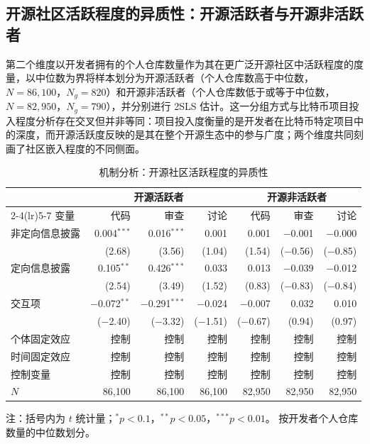 \documentclass[
    type = master, %
    degree = professional,        %
    decl-page,  %
    twoside,                %
    fontset = fandol %
  ]{njuthesis}
\renewcommand{\footnotesize}{\zihao{-5}}
\begin{document}
\subsection{开源社区活跃程度的异质性：开源活跃者与开源非活跃者}

第二个维度以开发者拥有的个人仓库数量作为其在更广泛开源社区中活跃程度的度量，以中位数为界将样本划分为开源活跃者（个人仓库数高于中位数，$N = 86{,}100$，$N_g = 820$）和开源非活跃者（个人仓库数低于或等于中位数，$N = 82{,}950$，$N_g = 790$），并分别进行 2SLS 估计。这一分组方式与比特币项目投入程度分析存在交叉但并非等同：项目投入度衡量的是开发者在比特币特定项目中的深度，而开源活跃度反映的是其在整个开源生态中的参与广度；两个维度共同刻画了社区嵌入程度的不同侧面。

\begin{table}[htbp]
    \centering
    \caption{机制分析：开源社区活跃程度的异质性}
    \label{tab:mechanism-active}
    \small
    \begin{tabularx}{\textwidth}{Xrrrrrr}
        \toprule
        & \multicolumn{3}{c}{开源活跃者}
        & \multicolumn{3}{c}{开源非活跃者} \\
        \cmidrule(lr){2-4}\cmidrule(lr){5-7}
        变量 & 代码 & 审查 & 讨论 & 代码 & 审查 & 讨论 \\
        \midrule
        非定向信息披露
            & 0.004$^{***}$ & 0.016$^{***}$ & 0.001
            & 0.001 & $-$0.001 & $-$0.000 \\
            & (2.68) & (3.56) & (1.04)
            & (1.54) & ($-$0.56) & ($-$0.85) \\[0.4em]
        定向信息披露
            & 0.105$^{**}$ & 0.426$^{***}$ & 0.033
            & 0.013 & $-$0.039 & $-$0.012 \\
            & (2.54) & (3.49) & (1.52)
            & (0.83) & ($-$0.83) & ($-$0.84) \\[0.4em]
        交互项
            & $-$0.072$^{**}$ & $-$0.291$^{***}$ & $-$0.024
            & $-$0.007 & 0.032 & 0.010 \\
            & ($-$2.40) & ($-$3.32) & ($-$1.51)
            & ($-$0.67) & (0.94) & (0.97) \\[0.4em]
        \midrule
        个体固定效应 & 控制 & 控制 & 控制 & 控制 & 控制 & 控制 \\
        时间固定效应 & 控制 & 控制 & 控制 & 控制 & 控制 & 控制 \\
        控制变量 & 控制 & 控制 & 控制 & 控制 & 控制 & 控制 \\
        $N$ & 86,100 & 86,100 & 86,100 & 82,950 & 82,950 & 82,950 \\
        \bottomrule
    \end{tabularx}
    \begin{minipage}{\textwidth}
        \vspace{0.3em}
        \footnotesize 注：括号内为 $t$ 统计量；$^{*}p<0.1$，$^{**}p<0.05$，$^{***}p<0.01$。
        按开发者个人仓库数量的中位数划分。
    \end{minipage}
\end{table}
\end{document}
